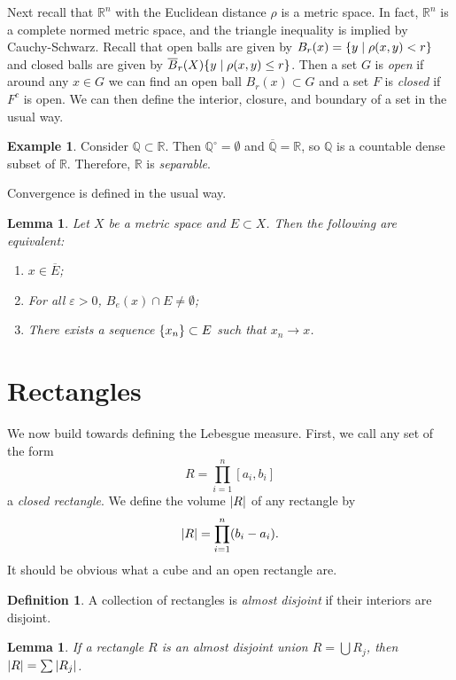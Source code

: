 \documentclass[leqno, openany]{memoir}
\newtheorem{lem}[thm]{Lemma}
\theoremstyle{definition}
\newtheorem{defn}[thm]{Definition}
\newtheorem{exm}[thm]{Example}
\theoremstyle{remark}
\theoremstyle{plain}
\theoremstyle{definition}
\theoremstyle{remark}
\newcommand{\R}{\mathbb{R}}
\newcommand{\Q}{\mathbb{Q}}
\newcommand{\ep}{\varepsilon}
\newcommand{\ol}[1]{\overline{#1}}
\begin{document}
Next recall that $\R^n$ with the Euclidean distance $\rho$ is a metric space.
In fact, $\R^n$ is a complete normed metric space, and the triangle inequality
is implied by Cauchy-Schwarz. Recall that open balls are given by $B_r(x) =
\qty{y \mid \rho(x,y) < r}$ and closed balls are given by $\ol{B}_r(X)\qty{y
\mid \rho(x,y) \leq r}$. Then a set $G$ is \textit{open} if around any $x \in
G$ we can find an open ball $B_r(x) \subset G$ and a set $F$ is \textit{closed}
if $F^c$ is open. We can then define the interior, closure, and boundary of a
set in the usual way.

\begin{exm} Consider $\Q \subset \R$. Then $\Q^{\circ} = \emptyset$ and
$\ol{\Q} = \R$, so $\Q$ is a countable dense subset of $\R$. Therefore, $\R$ is
\textit{separable}.  \end{exm}

Convergence is defined in the usual way.  \begin{lem} Let $X$ be a metric space
    and $E \subset X$. Then the following are equivalent: \begin{enumerate}
        \item $x \in \ol{E}$; \item For all $\ep > 0$, $B_e(x) \cap E \neq
            \emptyset$; \item There exists a sequence $\qty{x_n} \subset E$
            such that $x_n \to x$.  \end{enumerate} \end{lem}

\section{Rectangles}%

We now build towards defining the Lebesgue measure. First, we call any set of
the form \[ R = \prod_{i=1}^n [a_i,b_i] \] a \textit{closed rectangle}. We
define the volume $\abs{R}$ of any rectangle by \[ \abs{R} = \prod_{i=1}^n (b_i
- a_i). \] It should be obvious what a cube and an open rectangle are.

\begin{defn} A collection of rectangles is \textit{almost disjoint} if their
interiors are disjoint.  \end{defn}

\begin{lem} If a rectangle $R$ is an almost disjoint union $R = \bigcup R_j$,
then $\abs{R} = \sum \abs{R_j}$.  \end{lem}
\end{document}
